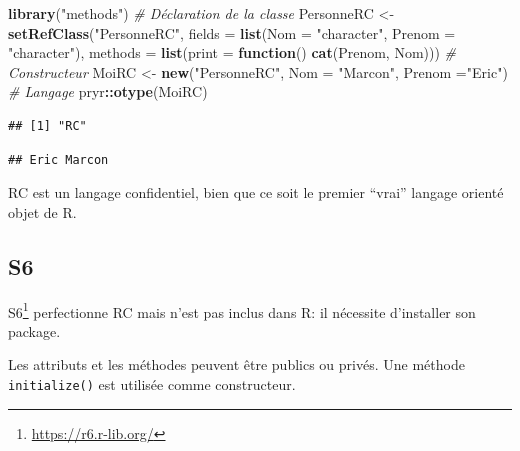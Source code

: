 \documentclass[
  12pt,
  french,
  a4paper,
  extrafontsizes,onecolumn,openright
  ]{memoir}
\newenvironment{Shaded}{\begin{snugshade}}{\end{snugshade}}
\newcommand{\CommentTok}[1]{\textcolor[rgb]{0.56,0.35,0.01}{\textit{#1}}}
\newcommand{\ControlFlowTok}[1]{\textcolor[rgb]{0.13,0.29,0.53}{\textbf{#1}}}
\newcommand{\DataTypeTok}[1]{\textcolor[rgb]{0.13,0.29,0.53}{#1}}
\newcommand{\KeywordTok}[1]{\textcolor[rgb]{0.13,0.29,0.53}{\textbf{#1}}}
\newcommand{\NormalTok}[1]{#1}
\newcommand{\OperatorTok}[1]{\textcolor[rgb]{0.81,0.36,0.00}{\textbf{#1}}}
\newcommand{\StringTok}[1]{\textcolor[rgb]{0.31,0.60,0.02}{#1}}
\newlength{\rf}
\begin{document}
\begin{Shaded}
\begin{Highlighting}[]
\KeywordTok{library}\NormalTok{(}\StringTok{"methods"}\NormalTok{)}
\CommentTok{# Déclaration de la classe}
\NormalTok{PersonneRC <-}\StringTok{ }\KeywordTok{setRefClass}\NormalTok{(}\StringTok{"PersonneRC"}\NormalTok{, }
    \DataTypeTok{fields =} \KeywordTok{list}\NormalTok{(}\DataTypeTok{Nom =} \StringTok{"character"}\NormalTok{, }\DataTypeTok{Prenom =} \StringTok{"character"}\NormalTok{),}
    \DataTypeTok{methods =} \KeywordTok{list}\NormalTok{(}\DataTypeTok{print =} \ControlFlowTok{function}\NormalTok{() }\KeywordTok{cat}\NormalTok{(Prenom, Nom)))}
\CommentTok{# Constructeur}
\NormalTok{MoiRC <-}\StringTok{ }\KeywordTok{new}\NormalTok{(}\StringTok{"PersonneRC"}\NormalTok{, }\DataTypeTok{Nom =} \StringTok{"Marcon"}\NormalTok{, }\DataTypeTok{Prenom =}\StringTok{"Eric"}\NormalTok{)}
\CommentTok{# Langage}
\NormalTok{pryr}\OperatorTok{::}\KeywordTok{otype}\NormalTok{(MoiRC)}
\end{Highlighting}
\end{Shaded}

\begin{verbatim}
## [1] "RC"
\end{verbatim}

\begin{Shaded}
\end{Shaded}

\begin{verbatim}
## Eric Marcon
\end{verbatim}

\normalsize

RC est un langage confidentiel, bien que ce soit le premier \enquote{vrai} langage orienté objet de R.

\hypertarget{s6}{%
\subsection{S6}\label{s6}}

S6\footnote{\url{https://r6.r-lib.org/}} perfectionne RC mais n'est pas inclus dans R: il nécessite d'installer son package.

Les attributs et les méthodes peuvent être publics ou privés.
Une méthode \texttt{initialize()} est utilisée comme constructeur.
\end{document}
